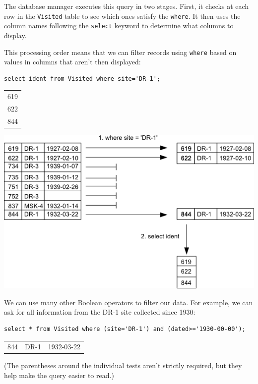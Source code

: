 \documentclass{book}
\begin{document}
The database manager executes this query in two stages. First, it checks
at each row in the \texttt{Visited} table to see which ones satisfy the
\texttt{where}. It then uses the column names following the
\texttt{select} keyword to determine what columns to display.

This processing order means that we can filter records using
\texttt{where} based on values in columns that aren't then displayed:

\begin{verbatim}
select ident from Visited where site='DR-1';
\end{verbatim}

\begin{tabular}{l}
619 \\
622 \\
844 \\
\end{tabular}

\includegraphics{novice/sql/img/sql-filter.png}

We can use many other Boolean operators to filter our data. For example,
we can ask for all information from the DR-1 site collected since 1930:

\begin{verbatim}
select * from Visited where (site='DR-1') and (dated>='1930-00-00');
\end{verbatim}

\begin{tabular}{lll}
844 & DR-1 & 1932-03-22 \\
\end{tabular}

(The parentheses around the individual tests aren't strictly required,
but they help make the query easier to read.)
\end{document}
